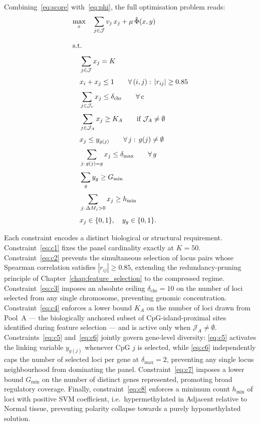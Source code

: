 Combining~\eqref{eq:score} with~\eqref{eq:phi}, the full optimisation problem
reads:
\begin{align}
&\underset{x}{\text{max}} \quad
  \sum_{j \in \mathcal{J}} v_j\,x_j + \mu\,\hat{\Phi}(x,y) \notag \\[8pt]
&\text{s.t.} \notag \\[4pt]
&\quad \sum_{j \in \mathcal{J}} x_j = K
   \label{eq:c1}\\[3pt]
&\quad x_i + x_j \le 1
   \qquad \forall\,(i,j):\,|r_{ij}| \ge 0.85
   \label{eq:c2}\\[3pt]
&\quad \sum_{j \in \mathcal{J}_c} x_j \le \delta_{\mathrm{chr}}
   \qquad \forall\, c
   \label{eq:c3}\\[3pt]
&\quad \sum_{j \in \mathcal{J}_A} x_j \ge K_A
   \qquad \text{if } \mathcal{J}_A \neq \emptyset
   \label{eq:c4}\\[3pt]
&\quad x_j \le y_{g(j)}
   \qquad \forall\, j:\, g(j) \neq \emptyset
   \label{eq:c5}\\[3pt]
&\quad \sum_{j:\,g(j)=g} x_j \le \delta_{\max}
   \qquad \forall\, g
   \label{eq:c6}\\[3pt]
&\quad \sum_{g} y_g \ge G_{\min}
   \label{eq:c7}\\[3pt]
&\quad \sum_{j:\,\Delta M_j > 0} x_j \ge h_{\min}
   \label{eq:c8}\\[3pt]
&\quad x_j \in \{0,1\},\quad y_g \in \{0,1\}. \notag
\end{align}

\noindent Each constraint encodes a distinct biological or structural requirement.
Constraint~\eqref{eq:c1} fixes the panel cardinality exactly at $K = 50$.
Constraint~\eqref{eq:c2} prevents the simultaneous selection of locus pairs whose
Spearman correlation satisfies $|r_{ij}| \ge 0.85$, extending the
redundancy-pruning principle of Chapter~\ref{chap:feature_selection} to the
compressed regime. Constraint~\eqref{eq:c3} imposes an absolute ceiling
$\delta_{\mathrm{chr}} = 10$ on the number of loci selected from any single
chromosome, preventing genomic concentration. Constraint~\eqref{eq:c4} enforces
a lower bound $K_A$ on the number of loci drawn from Pool~A --- the biologically
anchored subset of CpG-island-proximal sites identified during feature selection
--- and is active only when $\mathcal{J}_A \neq \emptyset$.
Constraints~\eqref{eq:c5} and~\eqref{eq:c6} jointly govern gene-level diversity:
\eqref{eq:c5} activates the linking variable $y_{g(j)}$ whenever CpG $j$ is
selected, while \eqref{eq:c6} independently caps the number of selected loci per
gene at $\delta_{\max} = 2$, preventing any single locus neighbourhood from
dominating the panel. Constraint~\eqref{eq:c7} imposes a lower bound $G_{\min}$
on the number of distinct genes represented, promoting broad regulatory coverage.
Finally, constraint~\eqref{eq:c8} enforces a minimum count $h_{\min}$ of loci
with positive SVM coefficient, i.e.\ hypermethylated in Adjacent relative to
Normal tissue, preventing polarity collapse towards a purely hypomethylated
solution.

